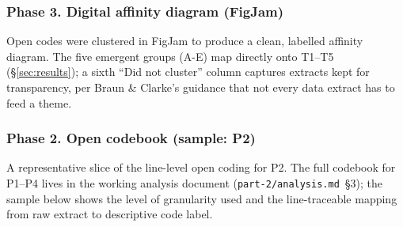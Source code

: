 \documentclass[a4paper,11pt]{article}
\begin{document}
\subsubsection*{Phase 3. Digital affinity diagram (FigJam)}
\label{app:analysis-figjam}

Open codes were clustered in FigJam to produce a clean, labelled
affinity diagram. The five emergent groups
(A-E) map directly onto T1--T5
(\S\ref{sec:results}); a sixth ``Did not cluster'' column captures
extracts kept for transparency, per Braun \& Clarke's guidance that
not every data extract has to feed a theme.



\subsubsection*{Phase 2. Open codebook (sample: P2)}
\label{app:analysis-coding}

A representative slice of the line-level open coding for P2. The full
codebook for P1--P4 lives in the working analysis document
(\texttt{part-2/analysis.md}~\S3); the sample below shows the level of
granularity used and the line-traceable mapping from raw extract to
descriptive code label.
\end{document}
